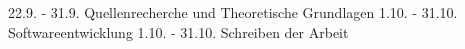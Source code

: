 22.9. - 31.9.	Quellenrecherche und Theoretische Grundlagen
1.10. - 31.10.	Softwareentwicklung
1.10. - 31.10.	Schreiben der Arbeit
